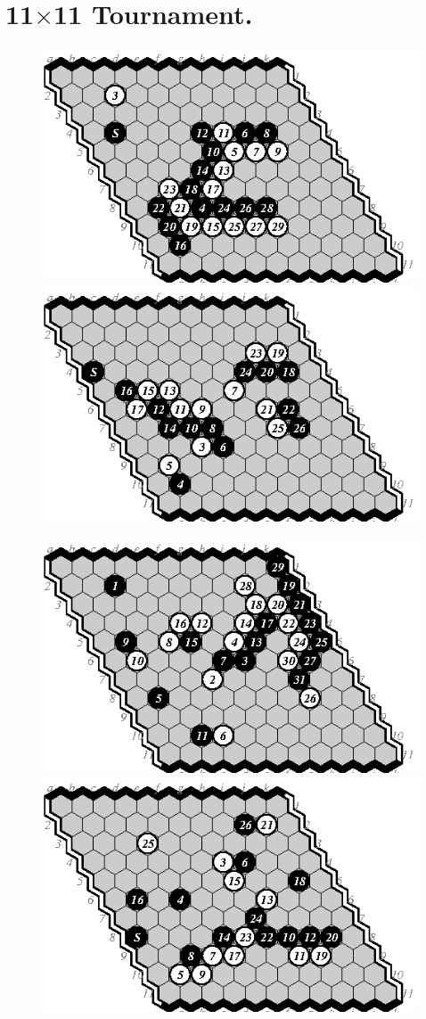 \documentclass{IOS-Book-Article}
\begin{document}
\section{11$\times$11 Tournament.}
\begin{figure}
\noindent\includegraphics[width=.58\columnwidth]{pix/11-01-me}\hspace*{-.14\columnwidth}\includegraphics[width=.58\columnwidth]{pix/11-02-em}
\vspace*{.2cm}

\noindent\includegraphics[width=.58\columnwidth]{pix/11-03-me}\hspace*{-.14\columnwidth}\includegraphics[width=.58\columnwidth]{pix/11-04-em}
\vspace*{.2cm}


\end{figure}
\end{document}
